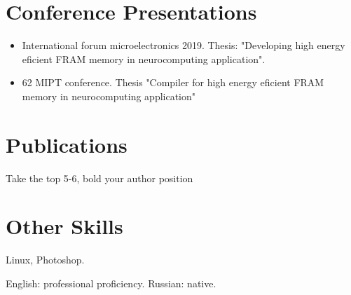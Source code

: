 \documentclass{article}
\begin{document}
\section{Conference Presentations }

\begin{itemize}
\item International forum microelectronics 2019. Thesis: "Developing high energy eficient FRAM memory in neurocomputing application".
\item 62 MIPT conference. Thesis "Compiler for high energy eficient FRAM memory in neurocomputing application"
\end{itemize}

 
\section{Publications}
Take the top 5-6, bold your author position 


\section{Other Skills}
\begin{description}[widest=Langauges]
\item[Software]	Linux, Photoshop.
\item[Languages]	English: professional proficiency.  Russian: native.
\end{description}
\end{document}
